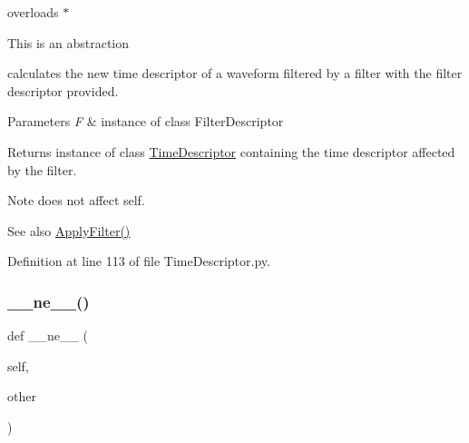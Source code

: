 overloads $\ast$ 

This is an abstraction

calculates the new time descriptor of a waveform filtered by a filter with the filter descriptor provided.


\begin{DoxyParams}{Parameters}
{\em F} & instance of class Filter\+Descriptor \\
\hline
\end{DoxyParams}
\begin{DoxyReturn}{Returns}
instance of class \hyperlink{classSignalIntegrity_1_1TimeDomain_1_1Waveform_1_1TimeDescriptor_1_1TimeDescriptor}{Time\+Descriptor} containing the time descriptor affected by the filter. 
\end{DoxyReturn}
\begin{DoxyNote}{Note}
does not affect self. 
\end{DoxyNote}
\begin{DoxySeeAlso}{See also}
\hyperlink{classSignalIntegrity_1_1TimeDomain_1_1Waveform_1_1TimeDescriptor_1_1TimeDescriptor_ad33074bdcb7626cce17d93fbd43ca1a9}{Apply\+Filter()} 
\end{DoxySeeAlso}


Definition at line 113 of file Time\+Descriptor.\+py.

\mbox{\label{classSignalIntegrity_1_1TimeDomain_1_1Waveform_1_1TimeDescriptor_1_1TimeDescriptor_aa0b54a20b36fcc55e1147de88d083072}} 
\subsubsection{\texorpdfstring{\+\_\+\+\_\+ne\+\_\+\+\_\+()}{\_\_ne\_\_()}}
{\footnotesize\ttfamily def \+\_\+\+\_\+ne\+\_\+\+\_\+ (\begin{DoxyParamCaption}\item[{}]{self,  }\item[{}]{other }\end{DoxyParamCaption})}



